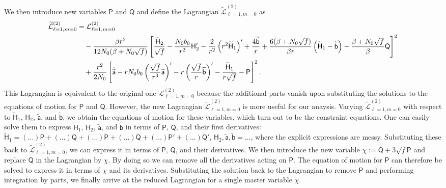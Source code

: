 \documentclass[aps,prd,preprintnumbers,superscriptaddress,nofootinbib,notitlepage]{revtex4-2}
\begin{document}
We then introduce new variables $\mathsf{P}$ and $\mathsf{Q}$ and define the Lagrangian $\widetilde{\mathcal L}^{(2)}_{\ell=1,m=0}$ as
\begin{align}
    \widetilde{\mathcal L}^{(2)}_{\ell=1,m=0}&=\mathcal L^{(2)}_{\ell=1,m=0}
    \notag \\ & \quad 
    -\frac{\beta r^2}{12N_0(\beta+N_0\sqrt{f})}
\left[\frac{\dot{\mathsf{H}}_2}{\sqrt{f}}
-\frac{N_0b_0}{r^2}\mathsf{H}_2'-\frac{2}{r^2}\left(r^2\widetilde{\mathsf{H}}_1\right)'
+\frac{4\widetilde{\mathsf{b}}}{r}
+\frac{6(\beta+N_0\sqrt{f})}{\beta r}
\left(\widetilde{\mathsf{H}}_1-\widetilde{\mathsf{b}}\right)-\frac{\beta+N_0\sqrt f}{\beta}\mathsf{Q}
\right]^2
\notag\\
&\quad
+\frac{r^2}{2N_0}\left[
\dot{\widetilde{\mathsf{a}}}-rN_0b_0\left(\frac{\sqrt{f}}{r^3}\widetilde{\mathsf{a}}\right)'
-r\left(\frac{\sqrt{f}}{r}\widetilde{\mathsf{b}}\right)'
-\frac{\widetilde{\mathsf{H}}_1}{r\sqrt{f}}-\mathsf{P}
\right]^2.
\end{align}
This Lagrangian is equivalent to the original one $\mathcal{L}^{(2)}_{\ell=1,m=0}$
because the additional parts vanish upon substituting the solutions to the equations of motion for $\mathsf{P}$ and $\mathsf{Q}$. However, the new Lagrangian $\widetilde{\mathcal L}^{(2)}_{\ell=1,m=0}$ is more useful for our anaysis.
Varying $\widetilde{\mathcal L}^{(2)}_{\ell=1,m=0}$ with respect to $\widetilde{\mathsf{H}}_1$, $\mathsf H_2$, $\widetilde{\mathsf a}$, and $\widetilde{\mathsf b}$, we obtain the equations of motion for these variables, which turn out to be the constraint equations.
One can easily solve them to express $\widetilde{\mathsf{H}}_1$, $\mathsf H_2$, $\widetilde{\mathsf a}$, and $\widetilde{\mathsf b}$ in terms of $\mathsf{P}$, $\mathsf{Q}$, and their first derivatives:
$\widetilde{\mathsf H}_1=(\dots)\mathsf P+(\dots)\mathsf Q+(\dots)\dot{\mathsf{P}}+(\dots)\dot{\mathsf Q}+(\dots)\mathsf P'+(\dots)\mathsf Q'$,
$\mathsf{H}_2,\widetilde{\mathsf{a}},\widetilde{\mathsf{b}}=\dots$,
where the explicit expressions are messy.
Substituting these back to $\widetilde{\mathcal L}^{(2)}_{\ell=1,m=0}$,
we can express it in terms of $\mathsf P$, $\mathsf Q$, and their derivatives.
We then introduce the new variable $\chi:=\mathsf Q+3\sqrt{f} \mathsf P$ and replace $\mathsf Q$ in the Lagrangian by $\chi$. By doing so we can remove all the derivatives acting on $\mathsf{P}$.
The equation of motion for $\mathsf P$ can therefore be solved to express it in terms of $\chi$ and its derivatives. Substituting the solution back to the Lagrangian to remove $\mathsf{P}$ and performing integration by parts, we finally arrive at the reduced Lagrangian for a single master variable $\chi$.
\end{document}

